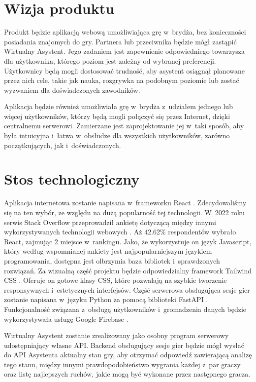 \section{Wizja produktu}

Produkt będzie aplikacją webową umożliwiająca grę w~brydża,
bez konieczności posiadania znajomych do gry.
Partnera lub przeciwnika będzie mógł zastąpić Wirtualny Asystent.
Jego zadaniem jest zapewnienie odpowiedniego
towarzysza dla użytkownika, którego poziom jest zależny od wybranej
preferencji. Użytkownicy będą mogli dostosować trudność, aby asystent osiągnął
planowane przez nich cele, takie jak nauka, rozgrywka na podobnym poziomie
lub zostać wyzwaniem dla doświadczonych zawodników.

Aplikacja będzie również umożliwiała grę w~brydża z~udziałem jednego lub więcej użytkowników,
którzy będą mogli połączyć się przez Internet, dzięki centralnemu serwerowi.
Zamierzane jest zaprojektowanie jej w~taki sposób, aby była intuicyjna i~łatwa
w~obsłudze dla wszystkich użytkowników, zarówno początkujących, jak
i~doświadczonych.


\section{Stos technologiczny}

Aplikacja internetowa zostanie napisana w~frameworku React \cite{React}.
Zdecydowaliśmy się na ten wybór, ze względu na dużą popularność tej
technologii. W~2022 roku serwis Stack Overflow \cite{StackOverflow} przeprowadził ankietę dotyczącą między innymi wykorzystywanych technologii
webowych \cite{React-stack}. Aż 42.62\% respondentów wybrało React,
zajmując 2 miejsce w~rankingu. Jako, że wykorzystuje on język Javascript,
który według wspomnianej ankiety jest najpopularniejszym językiem programowania,
dostępna jest olbrzymia baza bibliotek i~sprawdzonych rozwiązań. Za wizualną
część projektu będzie odpowiedzialny framework Tailwind CSS \cite{Tailwind}.
Oferuje on gotowe klasy CSS, które pozwalają na szybkie tworzenie responsywnych
i~estetycznych interfejsów. Część serwerowa obsługująca sesje gier zostanie
napisana w~języku Python \cite{Python} za pomocą biblioteki FastAPI
\cite{FastAPI}. Funkcjonalność związana z~obsługą użytkowników i~gromadzenia
danych będzie wykorzystywała usługę Google Firebase \cite{Firebase}.

Wirtualny Asystent zostanie zrealizowany jako osobny program serwerowy
udostępniający własne API. Backend obsługujący sesje gier
będzie mógł wysłać do API Asystenta aktualny stan gry, aby otrzymać
odpowiedź zawierającą analizę tego stanu, między innymi
prawdopodobieństwo wygrania każdej z~par graczy oraz listę
najlepszych ruchów, jakie mogą być wykonane przez następnego gracza.

